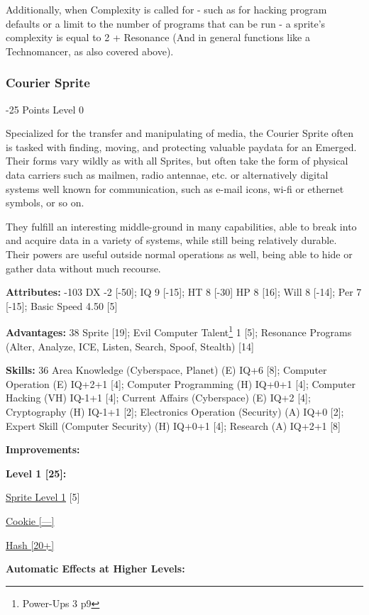 \begin{multicols*}{3}
Additionally, when Complexity is called for - such as for hacking program defaults or a limit to the number of programs that can be run - a sprite's complexity is equal to 2 + Resonance (And in general functions like a Technomancer, as also covered above).

\subsubsection{Courier Sprite}
\begin{flushright}
	 -25 Points Level 0
\end{flushright}

Specialized for the transfer and manipulating of media, the Courier Sprite often is tasked with finding, moving, and protecting valuable paydata for an Emerged. Their forms vary wildly as with all Sprites, but often take the form of physical data carriers such as mailmen, radio antennae, etc. or alternatively digital systems well known for communication, such as e-mail icons, wi-fi or ethernet symbols, or so on.

They fulfill an interesting middle-ground in many capabilities, able to break into and acquire data in a variety of systems, while still being relatively durable. Their powers are useful outside normal operations as well, being able to hide or gather data without much recourse.

\textbf{Attributes:} -103
DX -2 [-50]; IQ 9 [-15]; HT 8 [-30]
HP 8 [16]; Will 8 [-14]; Per 7 [-15]; Basic Speed 4.50 [5]

\textbf{Advantages:} 38
Sprite [19]; Evil Computer Talent\footnote{Power-Ups 3 p9} 1 [5]; Resonance Programs (Alter, Analyze, ICE, Listen, Search, Spoof, Stealth) [14]

\textbf{Skills:} 36
Area Knowledge (Cyberspace, Planet) (E) IQ+6 [8]; Computer Operation (E) IQ+2+1 [4]; Computer Programming (H) IQ+0+1 [4]; Computer Hacking (VH) IQ-1+1 [4]; Current Affairs (Cyberspace) (E) IQ+2 [4]; Cryptography (H) IQ-1+1 [2]; Electronics Operation (Security) (A) IQ+0 [2]; Expert Skill (Computer Security) (H) IQ+0+1 [4]; Research (A) IQ+2+1 [8]

\textbf{ Improvements:}

\textbf{Level 1 [25]:}

\hyperref[sprite_level]{Sprite Level 1} [5]

\hyperref[cookie]{Cookie [—]}

\hyperref[hash]{Hash [20+]}

\textbf{Automatic Effects at Higher Levels:}


\end{multicols*}
